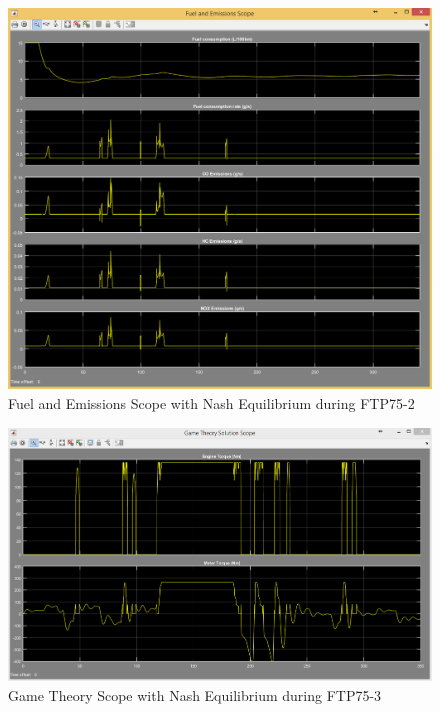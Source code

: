 \begin{figure}[h]
\centering
\includegraphics[scale=0.4]{figures/NashEquilibrium/FTP75-2/fuelEmissions13Juni}
\caption{Fuel and Emissions Scope with Nash Equilibrium during FTP75-2}
\label{fig:fene2}
\end{figure}


\begin{figure}[h]
\centering
\includegraphics[scale=0.4]{figures/NashEquilibrium/FTP75-3/gameTheory15Juni}
\caption{Game Theory Scope with Nash Equilibrium during FTP75-3}
\label{fig:gtne3}
\end{figure}

